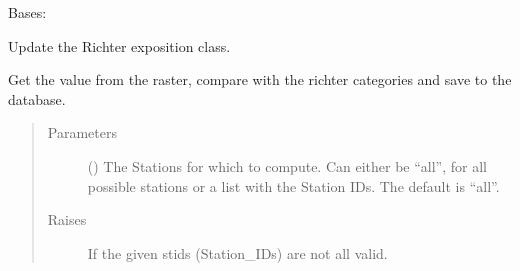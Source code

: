 \documentclass[letterpaper,10pt,english]{sphinxmanual}
\begin{document}
\begin{fulllineitems}
\label{\detokenize{weatherDB:weatherDB.stations.PrecipitationStations}}
\sphinxAtStartPar
Bases: {\hyperref[\detokenize{weatherDB:weatherDB.stations.StationsBase}]{}}

\begin{fulllineitems}
\label{\detokenize{weatherDB:weatherDB.stations.PrecipitationStations.update_richter_class}}
\sphinxAtStartPar
Update the Richter exposition class.

\sphinxAtStartPar
Get the value from the raster, compare with the richter categories and save to the database.
\begin{quote}\begin{description}
\item[{Parameters}] \leavevmode
\sphinxAtStartPar
{} (\sphinxstyleliteralemphasis{\sphinxupquote{, }}) \textendash{} The Stations for which to compute.
Can either be “all”, for all possible stations
or a list with the Station IDs.
The default is “all”.

\item[{Raises}] \leavevmode
\sphinxAtStartPar
{} \textendash{} If the given stids (Station\_IDs) are not all valid.

\end{description}\end{quote}

\end{fulllineitems}


\end{fulllineitems}

\end{document}
